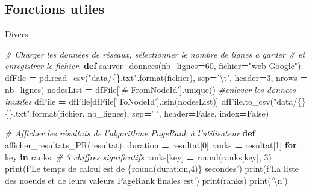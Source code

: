 \documentclass[10pt,a4paper]{article}
\newenvironment{Shaded}{\begin{snugshade}}{\end{snugshade}}
\newcommand{\BuiltInTok}[1]{#1}
\newcommand{\CharTok}[1]{\textcolor[rgb]{0.31,0.60,0.02}{#1}}
\newcommand{\CommentTok}[1]{\textcolor[rgb]{0.56,0.35,0.01}{\textit{#1}}}
\newcommand{\ControlFlowTok}[1]{\textcolor[rgb]{0.13,0.29,0.53}{\textbf{#1}}}
\newcommand{\DecValTok}[1]{\textcolor[rgb]{0.00,0.00,0.81}{#1}}
\newcommand{\KeywordTok}[1]{\textcolor[rgb]{0.13,0.29,0.53}{\textbf{#1}}}
\newcommand{\NormalTok}[1]{#1}
\newcommand{\OperatorTok}[1]{\textcolor[rgb]{0.81,0.36,0.00}{\textbf{#1}}}
\newcommand{\SpecialCharTok}[1]{\textcolor[rgb]{0.00,0.00,0.00}{#1}}
\newcommand{\SpecialStringTok}[1]{\textcolor[rgb]{0.31,0.60,0.02}{#1}}
\newcommand{\StringTok}[1]{\textcolor[rgb]{0.31,0.60,0.02}{#1}}
\newcommand{\VariableTok}[1]{\textcolor[rgb]{0.00,0.00,0.00}{#1}}
\theoremstyle{break}
\begin{document}
\hypertarget{fonctions-utiles}{%
\subsection{Fonctions utiles}\label{fonctions-utiles}}

Divers

\begin{Shaded}
\begin{Highlighting}[]
\CommentTok{# Charger les données de réseaux, sélectionner le nombre de lignes à garder}
\CommentTok{# et enregistrer le fichier. }
\KeywordTok{def}\NormalTok{ sauver_donnees(nb_lignes}\OperatorTok{=}\DecValTok{60}\NormalTok{, fichier}\OperatorTok{=}\StringTok{"web-Google"}\NormalTok{):}
\NormalTok{    dfFile }\OperatorTok{=}\NormalTok{ pd.read_csv(}\StringTok{"data/}\SpecialCharTok{\{\}}\StringTok{.txt"}\NormalTok{.}\BuiltInTok{format}\NormalTok{(fichier), sep}\OperatorTok{=}\StringTok{'}\CharTok{\textbackslash{}t}\StringTok{'}\NormalTok{,}
\NormalTok{                             header}\OperatorTok{=}\DecValTok{3}\NormalTok{, nrows }\OperatorTok{=}\NormalTok{ nb_lignes)}
\NormalTok{    nodesList }\OperatorTok{=}\NormalTok{ dfFile[}\StringTok{'# FromNodeId'}\NormalTok{].unique()}
    \CommentTok{#enlever les donnees inutiles}
\NormalTok{    dfFile }\OperatorTok{=}\NormalTok{ dfFile[dfFile[}\StringTok{'ToNodeId'}\NormalTok{].isin(nodesList)] }
\NormalTok{    dfFile.to_csv(}\StringTok{"data/}\SpecialCharTok{\{\}\{\}}\StringTok{.txt"}\NormalTok{.}\BuiltInTok{format}\NormalTok{(fichier, nb_lignes), sep}\OperatorTok{=}\StringTok{' '}\NormalTok{,}
\NormalTok{                  header}\OperatorTok{=}\VariableTok{False}\NormalTok{, index}\OperatorTok{=}\VariableTok{False}\NormalTok{)}
    
\CommentTok{# Afficher les résultats de l'algorithme PageRank à l'utilisateur}
\KeywordTok{def}\NormalTok{ afficher_resultats_PR(resultat):}
\NormalTok{    duration }\OperatorTok{=}\NormalTok{ resultat[}\DecValTok{0}\NormalTok{]}
\NormalTok{    ranks }\OperatorTok{=}\NormalTok{ resultat[}\DecValTok{1}\NormalTok{]}
    \ControlFlowTok{for}\NormalTok{ key }\KeywordTok{in}\NormalTok{ ranks: }\CommentTok{# 3 chiffres significatifs}
\NormalTok{        ranks[key] }\OperatorTok{=} \BuiltInTok{round}\NormalTok{(ranks[key], }\DecValTok{3}\NormalTok{) }
    \BuiltInTok{print}\NormalTok{(}\SpecialStringTok{f'Le temps de calcul est de }\SpecialCharTok{\{}\BuiltInTok{round}\NormalTok{(duration,}\DecValTok{4}\NormalTok{)}\SpecialCharTok{\}}\SpecialStringTok{ secondes'}\NormalTok{)}
    \BuiltInTok{print}\NormalTok{(}\SpecialStringTok{f'La liste des noeuds et de leurs valeurs PageRank finales est'}\NormalTok{)}
    \BuiltInTok{print}\NormalTok{(ranks)}
    \BuiltInTok{print}\NormalTok{(}\StringTok{'}\CharTok{\textbackslash{}n}\StringTok{'}\NormalTok{)}
\end{Highlighting}
\end{Shaded}
\end{document}
